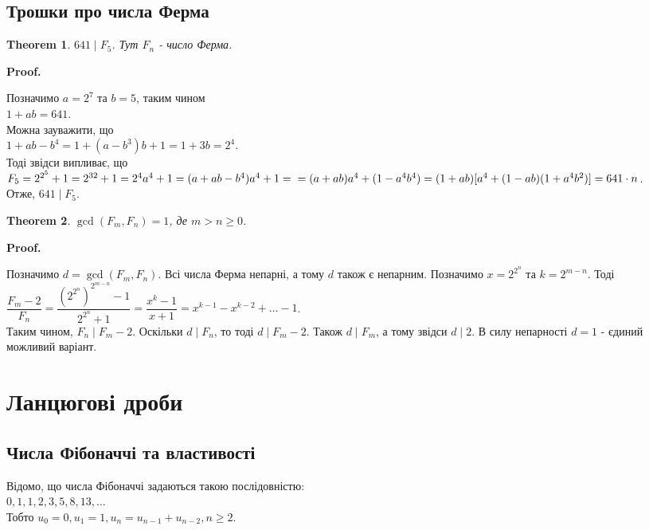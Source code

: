 \documentclass[a4paper, 10pt]{article}
\makeatletter
\theoremstyle{theoremdd}
\newtheorem{theorem}{Theorem}[subsection]
\theoremstyle{theoremdd}
\theoremstyle{theoremdd}
\theoremstyle{theoremdd}
\theoremstyle{theoremdd}
\theoremstyle{theoremdd}
\theoremstyle{theoremdd}
\theoremstyle{theoremdd}
\renewenvironment{proof}[1][Proof.\\]{\par
\pushQED{\hfill \qed}%
\normalfont \topsep6\p@\@plus6\p@\relax
\trivlist
\item\relax
{\bfseries
#1\@addpunct{.}}\hspace\labelsep\ignorespaces
}{%
\popQED\endtrivlist\@endpefalse
}
\makeatother
\begin{document}
\subsection{Трошки про числа Ферма}
\begin{theorem}
$641 \mid F_5$. Тут $F_n$ - число Ферма.
\end{theorem}

\begin{proof}
Позначимо $a = 2^7$ та $b =5$, таким чином\\
$1 + ab = 641$.\\
Можна зауважити, що\\
$1 + ab - b^4 = 1+(a-b^3)b+1 = 1+3b = 2^4$.\\
Тоді звідси випливає, що\\
$F_5 = 2^{2^5}+1 = 2^{32}+1 = 2^4 a^4+1 = (a+ab-b^4)a^4+1 = \\ = (a+ab)a^4+(1-a^4b^4)= (1+ab)[a^4+(1-ab)(1+a^4b^2)] = 641 \cdot n$.\\
Отже, $641 \mid F_5$.
\end{proof}

\begin{theorem}
$\gcd(F_m,F_n) = 1$, де $m>n\geq 0$.
\end{theorem}

\begin{proof}
Позначимо $d = \gcd(F_m,F_n)$. Всі числа Ферма непарні, а тому $d$ також є непарним. Позначимо $x = 2^{2^n}$ та $k = 2^{m-n}$. Тоді\\
$\dfrac{F_m-2}{F_n} = \dfrac{(2^{2^n})^{2^{m-n}}-1}{2^{2^n}+1} = \dfrac{x^k-1}{x+1} = x^{k-1} - x^{k-2} + \dots -1$.\\
Таким чином, $F_n \mid F_m-2$. Оскільки $d \mid F_n$, то тоді $d \mid F_m-2$. Також $d \mid F_m$, а тому звідси $d \mid 2$. В силу непарності $d=1$ - єдиний можливий варіант.
\end{proof}
\newpage

\section{Ланцюгові дроби}
\subsection{Числа Фібоначчі та властивості}
Відомо, що числа Фібоначчі задаються такою послідовністю:\\
$0,1,1,2,3,5,8,13,\dots$\\
Тобто $u_0 = 0, u_1 = 1, u_n = u_{n-1} + u_{n-2}, n \geq 2$.
\end{document}
